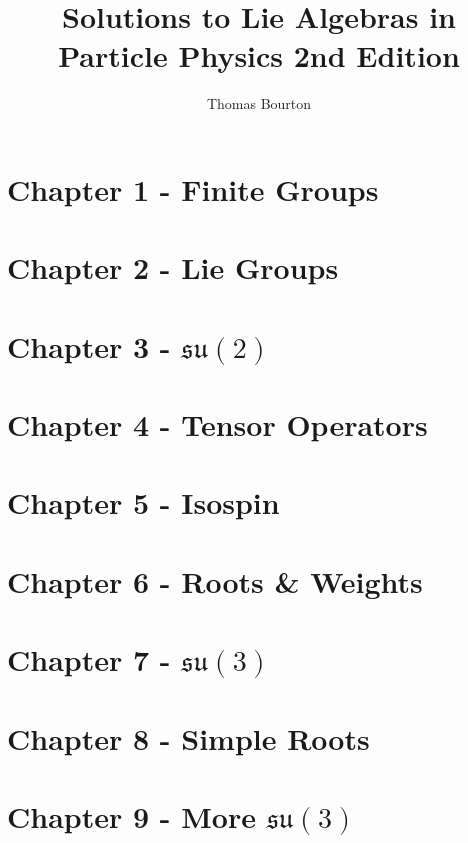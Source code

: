 \documentclass[a4paper,11pt]{article}
\title{\boldmath Solutions to Lie Algebras in Particle Physics 2nd Edition}
\author{Thomas Bourton}
\begin{document}
 


\maketitle
\newpage

\section{Chapter 1 - Finite Groups}\label{Sec:1}

%
\section{Chapter 2 - Lie Groups}\label{Sec:2}

%
\section{Chapter 3 - $\mathfrak{su}(2)$}\label{Sec:3}


\section{Chapter 4 - Tensor Operators}\label{Sec:4}


\section{Chapter 5 - Isospin}\label{Sec:5}


\section{Chapter 6 - Roots \& Weights}\label{Sec:6}


\section{Chapter 7 - $\mathfrak{su}(3)$}\label{Sec:7}


\section{Chapter 8 - Simple Roots}\label{Sec:8}


\section{Chapter 9 - More $\mathfrak{su}(3)$}\label{Sec:9}

\end{document}
